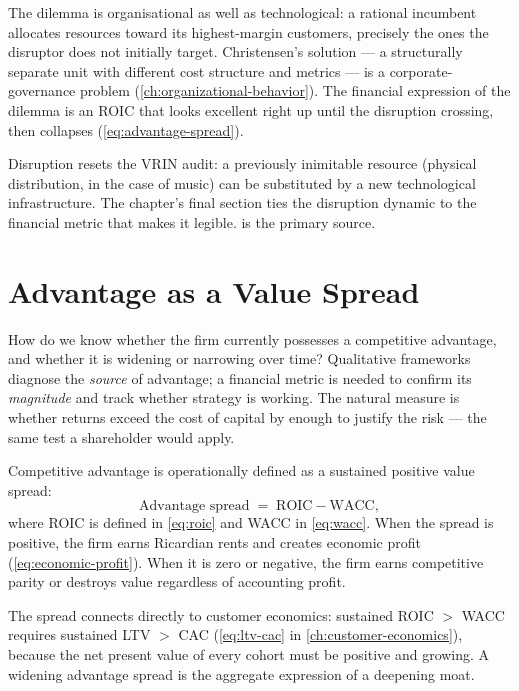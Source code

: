 The dilemma is organisational as well as technological: a rational incumbent allocates
resources toward its highest-margin customers, precisely the ones the disruptor does not
initially target. Christensen's solution --- a structurally separate unit with different
cost structure and metrics --- is a corporate-governance problem (\cref{ch:organizational-behavior}).
The financial expression of the dilemma is an ROIC that looks excellent right up until the
disruption crossing, then collapses (\cref{eq:advantage-spread}).

Disruption resets the VRIN audit: a previously inimitable resource (physical distribution,
in the case of music) can be substituted by a new technological infrastructure. The chapter's
final section ties the disruption dynamic to the financial metric that makes it legible.
\textcite{christensen1997} is the primary source.

\section{Advantage as a Value Spread}\label{sec:advantage-spread}

How do we know whether the firm currently possesses a competitive advantage, and whether
it is widening or narrowing over time? Qualitative frameworks diagnose the \emph{source} of
advantage; a financial metric is needed to confirm its \emph{magnitude} and track whether
strategy is working. The natural measure is whether returns exceed the cost of capital by
enough to justify the risk --- the same test a shareholder would apply.

Competitive advantage is operationally defined as a sustained positive value spread:
\begin{equation}\label{eq:advantage-spread}
  \text{Advantage spread} \;=\; \mathrm{ROIC} - \mathrm{WACC},
\end{equation}
where ROIC is defined in \cref{eq:roic} and WACC in \cref{eq:wacc}. When the spread is
positive, the firm earns Ricardian rents and creates economic profit (\cref{eq:economic-profit}).
When it is zero or negative, the firm earns competitive parity or destroys value regardless
of accounting profit.

The spread connects directly to customer economics: sustained ROIC $>$ WACC requires
sustained LTV $>$ CAC (\cref{eq:ltv-cac} in \cref{ch:customer-economics}), because the
net present value of every cohort must be positive and growing. A widening advantage spread
is the aggregate expression of a deepening moat.

